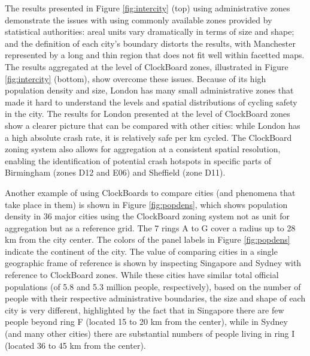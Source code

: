 \documentclass{josis}
\begin{document}
The results presented in Figure \ref{fig:intercity} (top) using administrative zones demonstrate the issues with using commonly available zones provided by statistical authorities: areal units vary dramatically in terms of size and shape; and the definition of each city's boundary distorts the results, with Manchester represented by a long and thin region that does not fit well within facetted maps.
The results aggregated at the level of ClockBoard zones, illustrated in Figure \ref{fig:intercity} (bottom), show overcome these issues.
Because of its high population density and size, London has many small administrative zones that made it hard to understand the levels and spatial distributions of cycling safety in the city.
The results for London presented at the level of ClockBoard zones show a clearer picture that can be compared with other cities: while London has a high absolute crash rate, it is relatively safe per km cycled.
The ClockBoard zoning system also allows for aggregation at a consistent spatial resolution, enabling the identification of potential crash hotspots in specific parts of Birmingham (zones D12 and E06) and Sheffield (zone D11).

Another example of using ClockBoards to compare cities (and phenomena that take place in them) is shown in Figure \ref{fig:popdens}, which shows population density in 36 major cities using the ClockBoard zoning system not as unit for aggregation but as a reference grid.
The 7 rings A to G cover a radius up to 28 km from the city center.
The colors of the panel labels in Figure \ref{fig:popdens} indicate the continent of the city.
The value of comparing cities in a single geographic frame of reference is shown by inspecting Singapore and Sydney with reference to ClockBoard zones.
While these cities have similar total official populations (of 5.8 and 5.3 million people, respectively), based on the number of people with their respective administrative boundaries, the size and shape of each city is very different, highlighted by the fact that in Singapore there are few people beyond ring F (located 15 to 20 km from the center), while in Sydney (and many other cities) there are substantial numbers of people living in ring I (located 36 to 45 km from the center).
\end{document}

